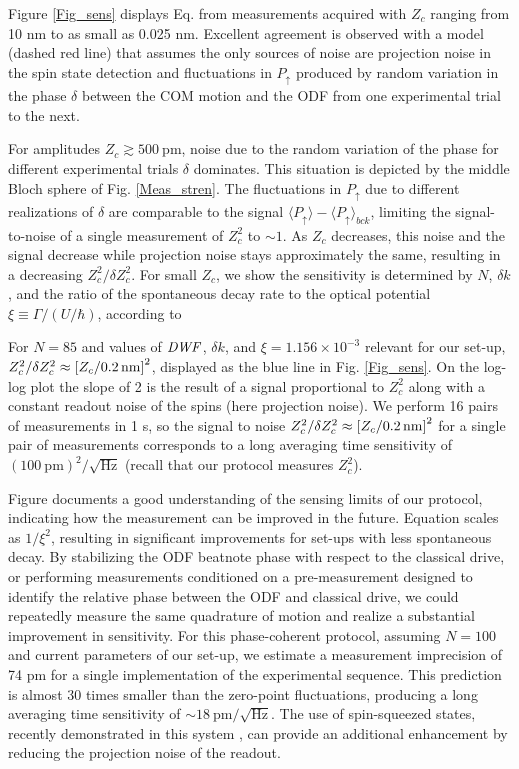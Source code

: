 \documentclass[aps,prl,twocolumn,superscriptaddress,floatfix]{revtex4-1}
\begin{document}
Figure \ref{Fig_sens} displays Eq.  from measurements acquired with $Z_{c}$
ranging from 10 nm to as small as 0.025 nm. Excellent agreement is
observed with a model (dashed red line) that assumes the only sources
of noise are projection noise in the spin state detection and fluctuations
in $P_{\uparrow}$ produced by random variation in the phase $\delta$ between the COM motion and the ODF from one experimental trial to the next.

For amplitudes $Z_{c}\gtrsim 500\:\mathrm{pm}$, noise due to the random variation of the phase for different experimental trials $\delta$ dominates. This situation is depicted by the middle Bloch sphere of Fig. \ref{Meas_stren}. The fluctuations in $P_{\uparrow}$ due to different realizations of $\delta$ are comparable to the signal $\langle P_{\uparrow}\rangle - \langle P_{\uparrow} \rangle_{bck}$, limiting the signal-to-noise of a single measurement of $Z_{c}^{2}$
to ${\sim} 1$. As $Z_{c}$ decreases, this noise and the signal
decrease while projection noise stays approximately the same, resulting
in a decreasing $Z_{c}^{2}/\delta Z_{c}^{2}$. For small $Z_c$, we show the sensitivity is determined by $N$, $\delta k$, and the ratio of the spontaneous decay rate to the optical potential $\xi\equiv\Gamma/\left(U/\hbar\right)$, according to

For $N=85$  and values of $\rm{\it{DWF}}$, $\delta k$, and $\xi=1.156\times10^{-3}$ relevant for our set-up, $Z_c^2/\delta Z_c^2 \approx \left[ Z_c/ 0.2 \, \rm{nm} \right]^2$, displayed as the blue line in Fig. \ref{Fig_sens}. On the log-log plot the slope of 2 is the result of a signal proportional to $Z_c^2$ along with a constant readout noise of the spins (here projection noise). We perform 16 pairs of measurements in 1 s, so the signal to noise ${Z_{c}^{2}}/{\delta Z_{c}^{2}} \approx \left[ Z_c/ 0.2 \, \rm{nm} \right]^2$ for a single pair of measurements corresponds to a long averaging time sensitivity of $\left(100\:\mathrm{pm}\right)^{2}/\sqrt{\mathrm{Hz}}$ (recall that our protocol measures $Z_{c}^2$).

Figure documents a good understanding of the sensing limits
of our protocol, indicating how the measurement can be improved in the future.
Equation  scales as $1/\xi^{2}$, resulting in
significant improvements for set-ups with less spontaneous decay. By stabilizing the ODF beatnote phase with respect to the classical drive, or performing measurements conditioned on a pre-measurement designed to identify the relative phase between the ODF and classical drive, we could repeatedly measure the same quadrature of motion and realize a substantial improvement in sensitivity. 
For this phase-coherent protocol, assuming $N=100$ and current parameters of our set-up, we estimate  a measurement imprecision of 74 pm for a single implementation of the experimental sequence. This prediction is almost 30 times smaller than the zero-point fluctuations, producing a long averaging time sensitivity of ${\sim}18\:\mathrm{pm/\sqrt{\mathrm{Hz}}}$. The use of spin-squeezed states, recently demonstrated in this system , can provide an additional enhancement by reducing the projection noise of the readout.
\end{document}
